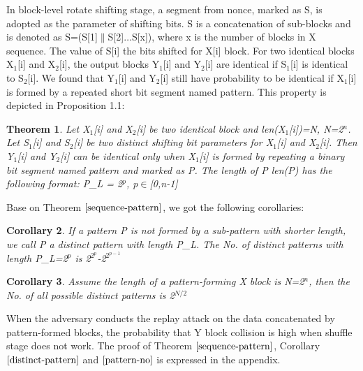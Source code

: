 \documentclass{article}
\newtheorem{theorem}{Theorem}[section]
\newtheorem{corollary}[theorem]{Corollary}
\begin{document}
In block-level rotate shifting stage, a segment from nonce, marked as S, is adopted as the parameter of shifting bits. S is a concatenation of sub-blocks and is denoted as S=(S[1]$\|$S[2]$\ldots$S[x]), where x is the number of blocks in X sequence. The value of S[i] the bits shifted for X[i] block.
For two identical blocks X$_1$[i] and X$_2$[i], the output blocks Y$_1$[i] and Y$_2$[i] are identical if S$_1$[i] is identical to S$_2$[i]. We found that Y$_1$[i] and Y$_2$[i] still have probability to be identical if X$_1$[i] is formed by a repeated short bit segment named pattern. This property is depicted in Proposition 1.1:
\begin{theorem}
Let X$_1$[i] and X$_2$[i] be two identical block and len(X$_1$[i])=N, N=2$^n$. Let S$_1$[i] and S$_2$[i] be two distinct shifting bit parameters for X$_1$[i] and X$_2$[i].
Then Y$_1$[i] and Y$_2$[i] can be identical only when X$_1$[i] is formed by repeating a binary bit segment named pattern and marked as P. The length of P len(P) has the following format:
	P\_L = 2$^p$, p$\in$[0,n-1]
\label{sequence-pattern}
\end{theorem}
Base on Theorem $\ref{sequence-pattern}$, we got the following corollaries:
\begin{corollary}
If a pattern P is not formed by a sub-pattern with shorter length, we call P a distinct pattern with length P\_L. The No. of distinct patterns with length P\_L=2$^p$ is 2$^{2^p}$-2$^{2^{p-1}}$
\label{distinct-pattern}
\end{corollary}
\begin{corollary}
Assume the length of a pattern-forming X block is N=2$^n$, then the No. of all possible distinct patterns is 2$^{N/2}$
\label{pattern-no}
\end{corollary}

When the adversary conducts the replay attack on the data concatenated by pattern-formed blocks, the probability that Y block collision is high when shuffle stage does not work. The proof of Theorem $\ref{sequence-pattern}$, Corollary $\ref{distinct-pattern}$ and $\ref{pattern-no}$ is expressed in the appendix. 
\end{document}
